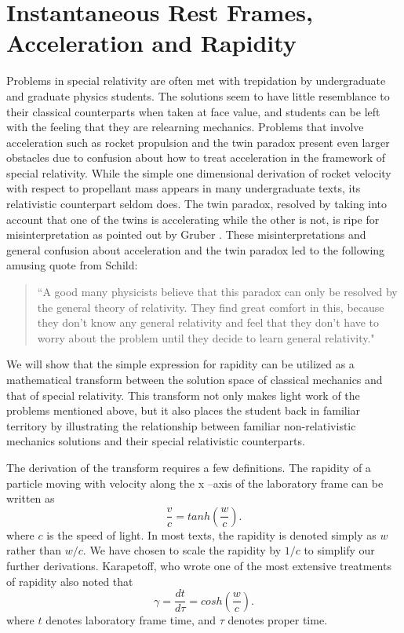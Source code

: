 \documentclass[prb,preprint]{revtex4-1}
\begin{document}
\section{Instantaneous Rest Frames, Acceleration and Rapidity} %
Problems in special relativity are often met with trepidation by undergraduate and graduate physics students.  The solutions seem to have little resemblance to their classical counterparts when taken at face value, and students can be left with the feeling that they are relearning mechanics.  Problems that involve acceleration such as rocket propulsion and the twin paradox present even larger obstacles due to confusion about how to treat acceleration in the framework of special relativity.  While the simple one dimensional derivation of rocket velocity with respect to propellant mass appears in many undergraduate texts, its relativistic counterpart seldom does.  The twin paradox, resolved by taking into account that one of the twins is accelerating while the other is not, is ripe for misinterpretation as pointed out by Gruber \cite{gruberi}. These misinterpretations and general confusion about acceleration and the twin paradox led to the following amusing quote from Schild\cite{schildi}:

\begin{quote}
``A good many physicists believe that this paradox can only be resolved by the general theory of relativity.  They find great comfort in this, because they don't know any general relativity and feel that they don't have to worry about the problem until they decide to learn general relativity."
\end{quote}

We will show that the simple expression for rapidity can be utilized as a mathematical transform between the solution space of classical mechanics and that of special relativity.  This transform not only makes light work of the problems mentioned above, but it also places the student back in familiar territory by illustrating the relationship between familiar non-relativistic mechanics solutions and their special relativistic counterparts.   

The derivation of the transform requires a few definitions.  The rapidity of a particle moving with velocity   along the x –axis of the laboratory frame can be written as 
\begin{equation}
\label{rapidity}
\frac{v}{c} = tanh\left(\frac{w}{c}\right).
\end{equation}
where $c$ is the speed of light.  In most texts, the rapidity is denoted simply as $w$ rather than $w/c$.  We have chosen to scale the rapidity by $1/c$ to simplify our further derivations.  Karapetoff, who wrote one of the most extensive treatments of rapidity\cite{karapetoffi} also noted that 
\begin{equation}
\label{gamma}
\gamma=\frac{dt}{d\tau} = cosh\left(\frac{w}{c}\right).
\end{equation}
where $t$ denotes laboratory frame time, and $\tau$ denotes proper time.  
\end{document}
